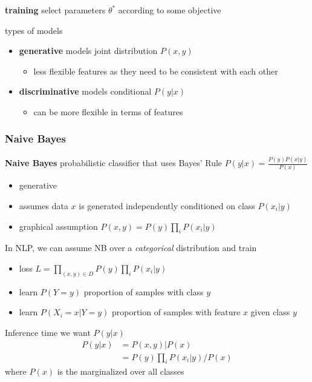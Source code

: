 \documentclass[]{article}
\theoremstyle{definition}
\begin{document}
\textbf{training} select parameters $\theta^*$ according to some objective

types of models
\begin{itemize}
    \item \textbf{generative} models joint distribution $P(x, y)$
        \begin{itemize}
            \item less flexible features as they need to be consistent with each other
        \end{itemize}
    \item \textbf{discriminative} models conditional $P(y|x)$
        \begin{itemize}
            \item can be more flexible in terms of features
        \end{itemize}
\end{itemize}

\subsubsection{Naive Bayes}%
\label{ssub:naive_bayes}

\textbf{Naive Bayes} probabilistic classifier that uses Bayes' Rule $P(y|x) = \frac{P(y)P(x|y)}{P(x)}$
\begin{itemize}
    \item generative
    \item assumes data $x$ is generated independently conditioned on class $P(x_i | y)$
    \item graphical assumption $P(x,y) = P(y) \prod_i P(x_i|y)$
\end{itemize}

In NLP, we can assume NB over a \textit{categorical} distribution and train
\begin{itemize}
    \item loss $L = \prod_{(x,y) \in D} P(y) \prod_i P(x_i|y)$
    \item learn $P(Y=y)$ proportion of samples with class $y$
    \item learn $P(X_i = x| Y= y)$ proportion of samples with feature $x$ given class $y$
\end{itemize}

Inference time we want $P(y|x)$
\begin{align}
    P(y|x) &= P(x,y) | P(x) \\
           &= P(y) \prod_i P(x_i|y) / P(x)
\end{align}
where $P(x)$ is the marginalized over all classes
\end{document}
